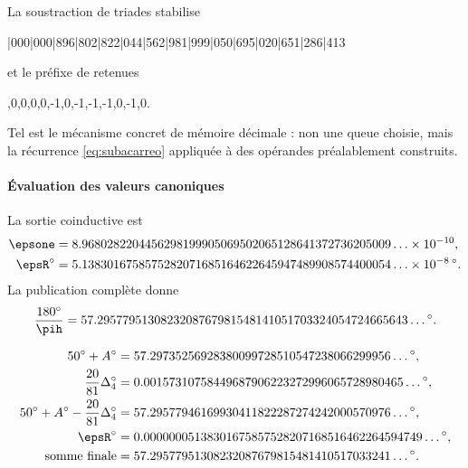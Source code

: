 La soustraction de triades stabilise
\begin{center}
|000|000|896|802|822|044|562|981|999|050|695|020|651|286|413
\end{center}
et le préfixe de retenues
\begin{center}
,0,0,0,0,-1,0,-1,-1,-1,0,-1,0.
\end{center}
Tel est le mécanisme concret de mémoire décimale : non une queue choisie, mais
la récurrence \eqref{eq:subacarreo} appliquée à des opérandes préalablement
construits.

\paragraph{Évaluation des valeurs canoniques}

La sortie coinductive est
\begin{align}
\epsone
&=8.9680282204456298199905069502065128641372736205009\ldots
\times10^{-10},\\
\epsR^\circ
&=5.1383016758575282071685164622645947489908574400054\ldots
\times10^{-8}\,{}^\circ.
\label{eq:epsilon-valores}
\end{align}
La publication complète donne
\[
\frac{180^\circ}{\pih}
=57.2957795130823208767981548141051703324054724665643\ldots{}^\circ.
\]

\begin{exactbox}
\begin{align*}
50^\circ+A^\circ
&=57.29735256928380099728510547238066299956\ldots{}^\circ,\\
\frac{20}{81}\Delta_4^\circ
&=0.00157310758449687906223272996065728980465\ldots{}^\circ,\\
50^\circ+A^\circ-\frac{20}{81}\Delta_4^\circ
&=57.29577946169930411822287274242000570976\ldots{}^\circ,\\
\epsR^\circ
&=0.00000005138301675857528207168516462264594749\ldots{}^\circ,\\
\text{somme finale}
&=57.29577951308232087679815481410517033241\ldots{}^\circ.
\end{align*}
\end{exactbox}

